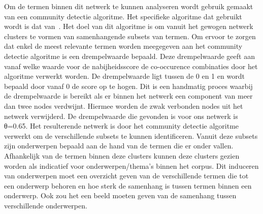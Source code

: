 Om de termen binnen dit netwerk te kunnen analyseren wordt gebruik gemaakt van een community detectie algoritme. Het specifieke algoritme dat gebruikt wordt is dat van~\cite{blondel2008fast}. Het doel van dit algoritme is om vanuit het gewogen netwerk clusters te vormen van samenhangende subsets van termen. Om ervoor te zorgen dat enkel de meest relevante termen worden meegegeven aan het community detectie algoritme is een drempelwaarde bepaald. Deze drempelwaarde geeft aan vanaf welke waarde voor de nabijheidsscore de co-occurence combinaties door het algoritme verwerkt worden. De drempelwaarde ligt tussen de 0 en 1 en wordt bepaald door vanaf 0 de score op te hogen. Dit is een handmatig proces waarbij de drempelwaarde is bereikt als er binnen het netwerk een component van meer dan twee nodes verdwijnt. Hiermee worden de zwak verbonden nodes uit het netwerk verwijderd. De drempelwaarde die gevonden is voor ons netwerk is θ=0.65. Het resulterende netwerk is door het community detectie algoritme verwerkt om de verschillende subsets te kunnen identificeren. Vanuit deze subsets zijn onderwerpen bepaald aan de hand van de termen die er onder vallen. Afhankelijk van de termen binnen deze clusters kunnen deze clusters gezien worden als indicatief voor onderwerpen/thema's binnen het corpus. Dit induceren van onderwerpen moet een overzicht geven van de verschillende termen die tot een onderwerp behoren en hoe sterk de samenhang is tussen termen binnen een onderwerp. Ook zou het een beeld moeten geven van de samenhang tussen verschillende onderwerpen. 
